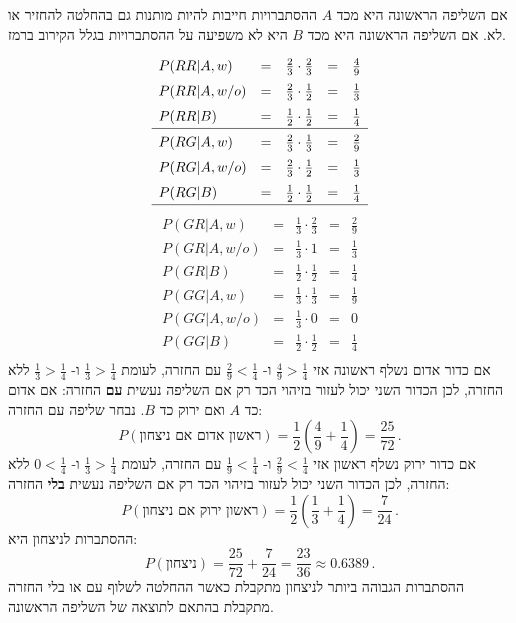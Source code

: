 אם השליפה הראשונה היא מכד
$A$
ההסתברויות חייבות להיות מותנות גם בהחלטה להחזיר או לא. אם השליפה הראשונה היא מכד
$B$
היא לא משפיעה על ההסתברויות בגלל הקירוב ברמז.
\[
\renewcommand*{\arraystretch}{1.5}
\begin{array}{lcccc}
P(RR|A,w) &=& \frac{2}{3} \cdot \frac{2}{3} &=& \frac{4}{9}\\
P(RR|A,w/o) &=& \frac{2}{3} \cdot \frac{1}{2} &=& \frac{1}{3}\\
P(RR|B) &=& \frac{1}{2} \cdot \frac{1}{2} &=& \frac{1}{4}\\
\hline
P(RG|A,w) &=& \frac{2}{3} \cdot \frac{1}{3} &=& \frac{2}{9}\\
P(RG|A,w/o) &=& \frac{2}{3} \cdot \frac{1}{2} &=& \frac{1}{3}\\
P(RG|B) &=& \frac{1}{2} \cdot \frac{1}{2} &=& \frac{1}{4}\\
\hline
\end{array}
\]
\[
\renewcommand*{\arraystretch}{1.5}
\begin{array}{lcccc}
P(GR|A,w) &=& \frac{1}{3} \cdot \frac{2}{3} &=& \frac{2}{9}\\
P(GR|A,w/o) &=& \frac{1}{3} \cdot 1 &=& \frac{1}{3}\\
P(GR|B) &=& \frac{1}{2} \cdot \frac{1}{2} &=& \frac{1}{4}\\
\hline
P(GG|A,w) &=& \frac{1}{3} \cdot \frac{1}{3} &=& \frac{1}{9}\\
P(GG|A,w/o) &=& \frac{1}{3} \cdot 0 &=&0\\
P(GG|B) &=& \frac{1}{2} \cdot \frac{1}{2} &=& \frac{1}{4}\\\end{array}
\]
אם כדור אדום נשלף ראשונה אזי 
$\frac{4}{9}>\frac{1}{4}$
ו-%
$\frac{2}{9}<\frac{1}{4}$
עם החזרה, לעומת
$\frac{1}{3}>\frac{1}{4}$
ו-%
$\frac{1}{3}>\frac{1}{4}$
ללא החזרה, לכן הכדור השני יכול לעזור בזיהוי הכד רק אם השליפה נעשית 
\textbf{עם}
החזרה: אם אדום כד
$A$
ואם ירוק כד
$B$.
נבחר שליפה עם החזרה:
\[
P(\textrm{ראשון אדום אם ניצחון})=\frac{1}{2}\left(\frac{4}{9}+\frac{1}{4}\right)=\frac{25}{72}\,.
\]
אם כדור ירוק נשלף ראשון אזי
$\frac{2}{9}<\frac{1}{4}$
ו-%
$\frac{1}{9}<\frac{1}{4}$
עם החזרה, לעומת
$\frac{1}{3}>\frac{1}{4}$
ו-%
$0<\frac{1}{4}$
ללא החזרה, לכן הכדור השני יכול לעזור בזיהוי הכד רק אם השליפה נעשית 
\textbf{בלי}
החזרה:
\[
P(\textrm{ראשון ירוק אם ניצחון})=\frac{1}{2}\left(\frac{1}{3}+\frac{1}{4}\right)=\frac{7}{24}\,.
\]
ההסתברות לניצחון היא:
\[
P(\textrm{ניצחון})=\frac{25}{72} + \frac{7}{24}=\frac{23}{36}\approx 0.6389\,.
\]
ההסתברות הגבוהה ביותר לניצחון מתקבלת כאשר ההחלטה לשלוף עם או בלי החזרה מתקבלת בהתאם לתוצאה של השליפה הראשונה.

